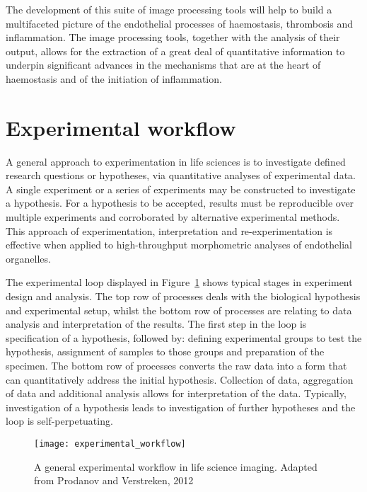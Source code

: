 The development of this suite of image processing tools will help to build a multifaceted picture of the endothelial processes of haemostasis, thrombosis and inflammation. The image processing tools, together with the analysis of their output, allows for the extraction of a great deal of quantitative information to underpin significant advances in the mechanisms that are at the heart of haemostasis and of the initiation of inflammation.

\section{Experimental workflow}
A general approach to experimentation in life sciences is to investigate defined research questions or hypotheses, via quantitative analyses of experimental data. A single experiment or a series of experiments may be constructed to investigate a hypothesis. For a hypothesis to be accepted, results must be reproducible over multiple experiments and corroborated by alternative experimental methods. This approach of experimentation, interpretation and re-experimentation is effective when applied to high-throughput morphometric analyses of endothelial organelles.

The experimental loop displayed in Figure~\ref{figure:endothelial_morphometry:introduction:experimental_workflow} shows typical stages in experiment design and analysis. The top row of processes deals with the biological hypothesis and experimental setup, whilst the bottom row of processes are relating to data analysis and interpretation of the results. The first step in the loop is specification of a hypothesis, followed by: defining experimental groups to test the hypothesis, assignment of samples to those groups and preparation of the specimen. The bottom row of processes converts the raw data into a form that can quantitatively address the initial hypothesis. Collection of data, aggregation of data and additional analysis allows for interpretation of the data. Typically, investigation of a hypothesis leads to investigation of further hypotheses and the loop is self-perpetuating.

\begin{figure}[htbp!]
	\centering
	\texttt{[image: experimental\_workflow]}
	\caption[Experimental workflow in life science imaging]{A general experimental workflow in life science imaging. Adapted from Prodanov and Verstreken, 2012~\cite{Prodanov2012}}
	\label{figure:endothelial_morphometry:introduction:experimental_workflow}
\end{figure}

